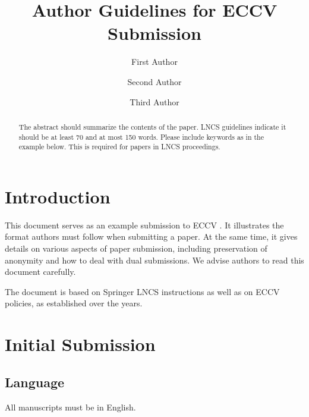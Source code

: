 \documentclass[runningheads]{eccv/llncs}
\begin{document}
\title{Author Guidelines for ECCV Submission} 
\author{First Author \and
Second Author \and
Third Author}

\maketitle

\begin{abstract}
    The abstract should summarize the contents of the paper. 
    LNCS guidelines indicate it should be at least 70 and at most 150 words.
    Please include keywords as in the example below. 
    This is required for papers in LNCS proceedings.
\end{abstract}
  

\section{Introduction}
\label{sec:intro}

This document serves as an example submission to ECCV \ECCVyear{}.
It illustrates the format authors must follow when submitting a paper. 
At the same time, it gives details on various aspects of paper submission, including preservation of anonymity and how to deal with dual submissions.
We advise authors to read this document carefully.

The document is based on Springer LNCS instructions as well as on ECCV policies, as established over the years.


\section{Initial Submission}

\subsection{Language}
All manuscripts must be in English.
\end{document}
